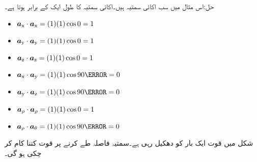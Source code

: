 حل:اس مثال میں سب اکائی سمتیہ ہیں۔اکائی سمتیہ کا طول ایک کے برابر ہوتا ہے۔
\begin{itemize}
\item
${\boldsymbol{a}}_{\textup{x}} \cdot {\boldsymbol{a}}_{\textup{x}} =(1) (1) \cos 0=1$\\
\item
${\boldsymbol{a}}_{\textup{y}} \cdot {\boldsymbol{a}}_{\textup{y}} =(1) (1) \cos 0=1$\\
\item
${\boldsymbol{a}}_{\textup{z}} \cdot {\boldsymbol{a}}_{\textup{z}} =(1) (1) \cos 0=1$\\
\item
$\ax \cdot \ay =(1) (1) \cos 90\degree=0$\\
\item
$\ay \cdot \az =(1) (1) \cos 90\degree=0$\\
\item
${\boldsymbol{a}}_{\rho} \cdot {\boldsymbol{a}}_{\rho} =(1) (1) \cos 0=1$\\
\item
$\arho \cdot \atheta =(1) (1) \cos 90\degree=0$\\
\end{itemize}
%
شکل   میں قوت  ایک بار کو دھکیل رہی ہے۔سمتیہ فاصلہ   طے کرنے پر قوت کتنا کام کر چکی ہو گی۔

